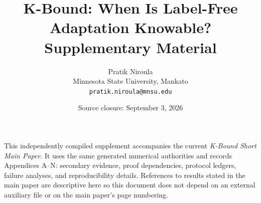 \documentclass[11pt]{article}
\title{\textbf{K-Bound: When Is Label-Free Adaptation Knowable?}\\[2pt]
\large Supplementary Material}
\author{Pratik Niroula\\
\small Minnesota State University, Mankato\\
\small \texttt{pratik.niroula@mnsu.edu}}
\date{Source closure: September 3, 2026}
\theoremstyle{plain}
\theoremstyle{definition}
\theoremstyle{remark}
\begin{document}
\maketitle
\noindent This independently compiled supplement accompanies the current
\emph{K-Bound Short Main Paper}. It uses the same generated numerical authorities and
records Appendices A--N: secondary evidence, proof dependencies, protocol ledgers,
failure analyses, and reproducibility details. References to results stated in the
main paper are descriptive here so this document does not depend on an external
auxiliary file or on the main paper's page numbering.

{\scriptsize}
\end{document}

